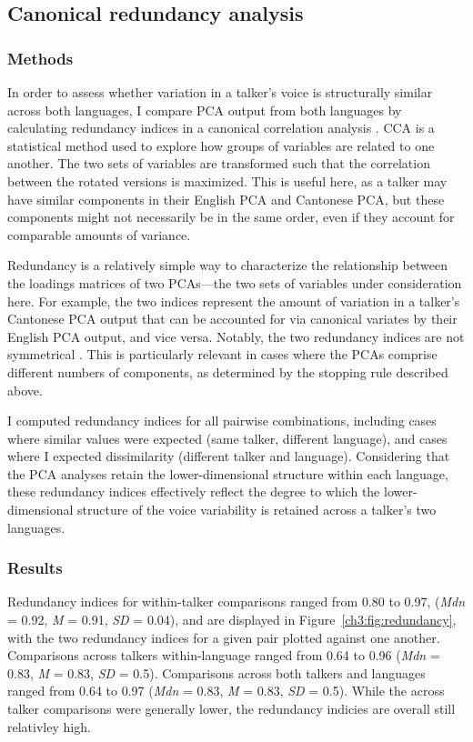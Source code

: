 \subsection{Canonical redundancy analysis}\label{ch3:sec:cca}
\subsubsection{Methods}
In order to assess whether variation in a talker's voice is structurally similar across both languages, I compare PCA output from both languages by calculating redundancy indices in a canonical correlation analysis \citep[CCA][]{stewart_1968_canonical, jolliffe_2002_pca}.  CCA is a statistical method used to explore how groups of variables are related to one another. The two sets of variables are transformed such that the correlation between the rotated versions is maximized. This is useful here, as a talker may have similar components in their English PCA and Cantonese PCA, but these components might not necessarily be in the same order, even if they account for comparable amounts of variance.

Redundancy is a relatively simple way to characterize the relationship between the loadings matrices of two PCAs---the two sets of variables under consideration here. For example, the two indices represent the amount of variation in a talker's Cantonese PCA output that can be accounted for via canonical variates by their English PCA output, and vice versa. Notably, the two redundancy indices are not symmetrical \citep{stewart_1968_canonical}. This is particularly relevant in cases where the PCAs comprise different numbers of components, as determined by the stopping rule described above.

I computed redundancy indices for all pairwise combinations, including cases where similar values were expected (same talker, different language), and cases where I expected dissimilarity (different talker and language). Considering that the PCA analyses retain the lower-dimensional structure within each language, these redundancy indices effectively reflect the degree to which the lower-dimensional structure of the voice variability is retained across a talker's two languages.

\subsubsection{Results}

Redundancy indices for within-talker comparisons ranged from 0.80 to 0.97, (\textit{Mdn} = 0.92, \textit{M} = 0.91, \textit{SD} = 0.04), and are displayed in Figure~\ref{ch3:fig:redundancy}, with the two redundancy indices for a given pair plotted against one another. Comparisons across talkers within-language ranged from 0.64 to 0.96 (\textit{Mdn} = 0.83, \textit{M} = 0.83, \textit{SD} = 0.5). Comparisons across both talkers and languages ranged from 0.64 to 0.97 (\textit{Mdn} = 0.83, \textit{M} = 0.83, \textit{SD} = 0.5). While the across talker comparisons were generally lower, the redundancy indicies are overall still relativley high. 

